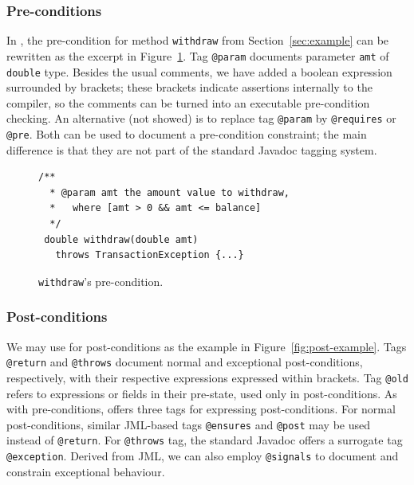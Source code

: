 \subsubsection{Pre-conditions}
In \contractjdoc, the pre-condition for method \lstinline!withdraw! from Section~\ref{sec:example} can be rewritten as the excerpt in Figure~\ref{fig:pre-example}.
Tag \lstinline!@param! documents parameter \lstinline!amt! of \lstinline!double! type.
Besides the usual comments, we have added a boolean expression
surrounded by brackets; these brackets indicate assertions internally to the \contractjdoc{} compiler, so the comments can be turned into an executable pre-condition checking.
An alternative (not showed) is to replace tag \lstinline!@param! by \lstinline!@requires! or \lstinline!@pre!. Both can be used to document a pre-condition constraint; the main difference is that they are not part of the standard Javadoc tagging system.

\begin{figure}
\centering
\begin{lstlisting}[basicstyle=\footnotesize\ttfamily,name=figxpi, frame=lines, mathescape=true]
 /**
  * @param amt the amount value to withdraw, 
  *   where [amt > 0 && amt <= balance]
  */
 double withdraw(double amt) 
   throws TransactionException {...}
\end{lstlisting}
\caption{\texttt{withdraw}'s pre-condition.}
\label{fig:pre-example}
\end{figure}


\subsubsection{Post-conditions}

We may use \contractjdoc{} for post-conditions as the example in Figure~\ref{fig:post-example}.
Tags \lstinline!@return! and \lstinline!@throws! document normal and exceptional post-conditions, respectively, with their respective expressions
expressed within brackets.
Tag \lstinline!@old! refers to expressions or fields in their pre-state, used only in post-conditions.
As with pre-conditions, \contractjdoc{} offers three tags for expressing post-conditions.
For normal post-conditions, similar JML-based tags \lstinline!@ensures! and \lstinline!@post! may be used instead of \lstinline!@return!.
For \lstinline!@throws! tag, the standard Javadoc offers a surrogate tag \lstinline!@exception!. 
Derived from JML, we can also employ \lstinline!@signals! to document and constrain exceptional behaviour.



